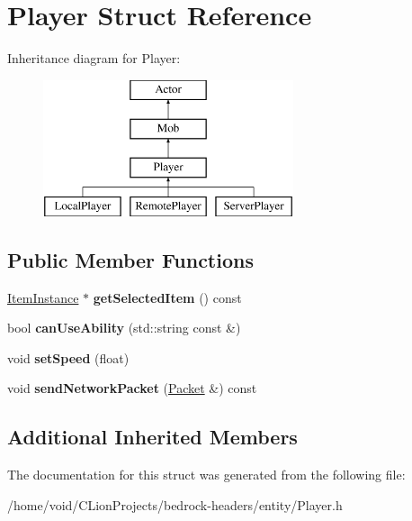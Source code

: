 \hypertarget{struct_player}{}\section{Player Struct Reference}
\label{struct_player}
Inheritance diagram for Player\+:\begin{figure}[H]
\begin{center}
\leavevmode
\includegraphics[height=4.000000cm]{struct_player}
\end{center}
\end{figure}
\subsection*{Public Member Functions}
\begin{DoxyCompactItemize}
\item 
\mbox{\label{struct_player_a3e9b3733573b7380db3e209aa42efdbd}} 
\mbox{\hyperlink{struct_item_instance}{Item\+Instance}} $\ast$ {\bfseries get\+Selected\+Item} () const
\item 
\mbox{\label{struct_player_ab9bba0f78f00ddb4fdbd1ff40fbce892}} 
bool {\bfseries can\+Use\+Ability} (std\+::string const \&)
\item 
\mbox{\label{struct_player_ac7f7316998e08d7af94108c873111b61}} 
void {\bfseries set\+Speed} (float)
\item 
\mbox{\label{struct_player_aeca4c5987d900ad709275d7075e3eed9}} 
void {\bfseries send\+Network\+Packet} (\mbox{\hyperlink{struct_packet}{Packet}} \&) const
\end{DoxyCompactItemize}
\subsection*{Additional Inherited Members}


The documentation for this struct was generated from the following file\+:\begin{DoxyCompactItemize}
\item 
/home/void/\+C\+Lion\+Projects/bedrock-\/headers/entity/Player.\+h\end{DoxyCompactItemize}
